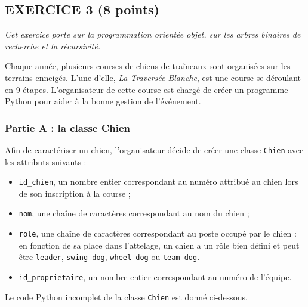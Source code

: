 \documentclass[
  paper=a4,
  ,captions=tableheading
]{scrartcl}
\author{}
\date{}
\title{}
\author{}
\date{}
\providecommand{\tightlist}{%
  \setlength{\itemsep}{0pt}\setlength{\parskip}{0pt}}
\begin{document}




\subsection{EXERCICE 3 (8 points)}\label{exercice-3-8-points}

\emph{Cet exercice porte sur la programmation orientée objet, sur les
arbres binaires de recherche et la récursivité.}

Chaque année, plusieurs courses de chiens de traîneaux sont organisées
sur les terrains enneigés. L'une d'elle, \emph{La Traversée Blanche},
est une course se déroulant en 9 étapes. L'organisateur de cette course
est chargé de créer un programme Python pour aider à la bonne gestion de
l'événement.

\subsubsection{Partie A : la classe
Chien}\label{partie-a-la-classe-chien}

Afin de caractériser un chien, l'organisateur décide de créer une classe
\texttt{Chien} avec les attributs suivants :

\begin{itemize}
\tightlist
\item
  \texttt{id\_chien}, un nombre entier correspondant au numéro attribué
  au chien lors de son inscription à la course ;
\item
  \texttt{nom}, une chaîne de caractères correspondant au nom du chien ;
\item
  \texttt{role}, une chaîne de caractères correspondant au poste occupé
  par le chien : en fonction de sa place dans l'attelage, un chien a un
  rôle bien défini et peut être
  \texttt{\textquotesingle{}leader\textquotesingle{}},
  \texttt{\textquotesingle{}swing\ dog\textquotesingle{}},
  \texttt{\textquotesingle{}wheel\ dog\textquotesingle{}} ou
  \texttt{\textquotesingle{}team\ dog\textquotesingle{}}.
\item
  \texttt{id\_proprietaire}, un nombre entier correspondant au numéro de
  l'équipe.
\end{itemize}

Le code Python incomplet de la classe \texttt{Chien} est donné
ci-dessous.
\end{document}
